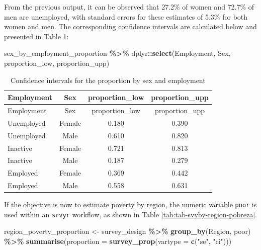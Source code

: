 \documentclass[
  english,
  12pt,
]{book}
\newenvironment{Shaded}{\begin{snugshade}}{\end{snugshade}}
\newcommand{\AttributeTok}[1]{\textcolor[rgb]{0.13,0.29,0.53}{#1}}
\newcommand{\FunctionTok}[1]{\textcolor[rgb]{0.13,0.29,0.53}{\textbf{#1}}}
\newcommand{\NormalTok}[1]{#1}
\newcommand{\OtherTok}[1]{\textcolor[rgb]{0.56,0.35,0.01}{#1}}
\newcommand{\SpecialCharTok}[1]{\textcolor[rgb]{0.81,0.36,0.00}{\textbf{#1}}}
\newcommand{\StringTok}[1]{\textcolor[rgb]{0.31,0.60,0.02}{#1}}
\begin{document}
From the previous output, it can be observed that 27.2\% of women and 72.7\% of men are unemployed, with standard errors for these estimates of 5.3\% for both women and men. The corresponding confidence intervals are calculated below and presented in Table \ref{tab:tab-confint-empleo-sexo}:

\begin{Shaded}
\begin{Highlighting}[]
\NormalTok{sex\_by\_employment\_proportion }\SpecialCharTok{\%\textgreater{}\%}
\NormalTok{  dplyr}\SpecialCharTok{::}\FunctionTok{select}\NormalTok{(Employment, Sex, proportion\_low, proportion\_upp)}
\end{Highlighting}
\end{Shaded}

\begin{longtable}[]{@{}lccc@{}}
\caption{\label{tab:tab-confint-empleo-sexo}Confidence intervals for the proportion by sex and employment}\tabularnewline
\toprule\noalign{}
Employment & Sex & proportion\_low & proportion\_upp \\
\midrule\noalign{}
\endfirsthead
\toprule\noalign{}
Employment & Sex & proportion\_low & proportion\_upp \\
\midrule\noalign{}
\endhead
\bottomrule\noalign{}
\endlastfoot
Unemployed & Female & 0.180 & 0.390 \\
Unemployed & Male & 0.610 & 0.820 \\
Inactive & Female & 0.721 & 0.813 \\
Inactive & Male & 0.187 & 0.279 \\
Employed & Female & 0.369 & 0.442 \\
Employed & Male & 0.558 & 0.631 \\
\end{longtable}

If the objective is now to estimate poverty by region, the numeric variable \texttt{poor} is used within an \texttt{srvyr} workflow, as shown in Table \ref{tab:tab-svyby-region-pobreza}.

\begin{Shaded}
\begin{Highlighting}[]
\NormalTok{region\_poverty\_proportion }\OtherTok{\textless{}{-}}\NormalTok{ survey\_design }\SpecialCharTok{\%\textgreater{}\%}
  \FunctionTok{group\_by}\NormalTok{(Region, poor) }\SpecialCharTok{\%\textgreater{}\%}
  \FunctionTok{summarise}\NormalTok{(}\AttributeTok{proportion =} \FunctionTok{survey\_prop}\NormalTok{(}\AttributeTok{vartype =} \FunctionTok{c}\NormalTok{(}\StringTok{"se"}\NormalTok{, }\StringTok{"ci"}\NormalTok{)))}
\end{Highlighting}
\end{Shaded}
\end{document}
